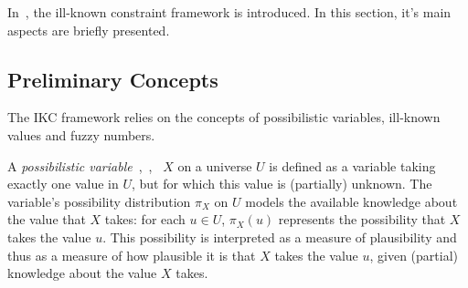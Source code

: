 
In~\cite{Pons2011}, the ill-known constraint framework is introduced. In this section, it's main aspects are briefly presented.


\subsection{\label{subsec:ikc-preliminaries}Preliminary Concepts}
The IKC framework relies on the concepts of possibilistic variables, ill-known values and fuzzy numbers.
 

\begin{definition}
\label{def:poss-variable}
A \emph{possibilistic variable}~\cite{Dubois1988a},~\cite{Pons2011},~\cite{Billiet2012} $X$ on a universe $U$ is defined as a variable taking exactly one value in $U$, but for which this value is (partially) unknown. The variable's possibility distribution $\pi_X$ on $U$ models the available knowledge about the value that $X$ takes: for each $u \in U$, $\pi_X(u)$ represents the possibility that $X$ takes the value $u$. This possibility is interpreted as a measure of plausibility and thus as a measure of how plausible it is that $X$ takes the value $u$, given (partial) knowledge about the value $X$ takes.
\end{definition}

